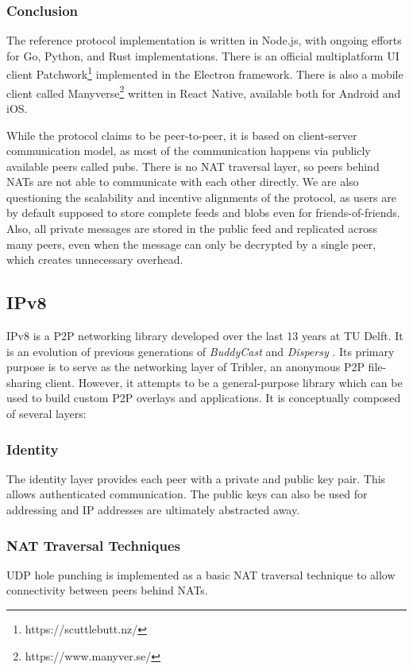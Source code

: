 \subsubsection{Conclusion}

The reference protocol implementation is written in Node.js, with ongoing efforts for Go, Python, and Rust implementations. There is an official multiplatform UI client Patchwork\footnote{https://scuttlebutt.nz/} implemented in the Electron framework. There is also a mobile client called Manyverse\footnote{https://www.manyver.se/} written in React Native, available both for Android and iOS.

While the protocol claims to be peer-to-peer, it is based on client-server communication model, as most of the communication happens via publicly available peers called pubs. There is no NAT traversal layer, so peers behind NATs are not able to communicate with each other directly. We are also questioning the scalability and incentive alignments of the protocol, as users are by default supposed to store complete feeds and blobs even for friends-of-friends. Also, all private messages are stored in the public feed and replicated across many peers, even when the message can only be decrypted by a single peer, which creates unnecessary overhead.

\subsection{IPv8}

IPv8 \cite{ipv8} is a P2P networking library developed over the last 13 years at TU Delft. It is an evolution of previous generations of \textit{BuddyCast} \cite{buddycast} and \textit{Dispersy} \cite{dispersy}. Its primary purpose is to serve as the networking layer of Tribler, an anonymous P2P file-sharing client. However, it attempts to be a general-purpose library which can be used to build custom P2P overlays and applications. It is conceptually composed of several layers:

\subsubsection{Identity}
The identity layer provides each peer with a private and public key pair. This allows authenticated communication. The public keys can also be used for addressing and IP addresses are ultimately abstracted away.

\subsubsection{NAT Traversal Techniques}
UDP hole punching is implemented as a basic NAT traversal technique to allow connectivity between peers behind NATs.

